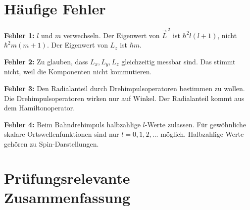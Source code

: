 \section{Häufige Fehler}

\begin{warningbox}
\textbf{Fehler 1:} \(l\) und \(m\) verwechseln. Der Eigenwert von \(\vec L^{\,2}\) ist \(\hbar^2l(l+1)\), nicht \(\hbar^2m(m+1)\). Der Eigenwert von \(L_z\) ist \(\hbar m\).
\end{warningbox}

\begin{warningbox}
\textbf{Fehler 2:} Zu glauben, dass \(L_x,L_y,L_z\) gleichzeitig messbar sind. Das stimmt nicht, weil die Komponenten nicht kommutieren.
\end{warningbox}

\begin{warningbox}
\textbf{Fehler 3:} Den Radialanteil durch Drehimpulsoperatoren bestimmen zu wollen. Die Drehimpulsoperatoren wirken nur auf Winkel. Der Radialanteil kommt aus dem Hamiltonoperator.
\end{warningbox}

\begin{warningbox}
\textbf{Fehler 4:} Beim Bahndrehimpuls halbzahlige \(l\)-Werte zulassen. Für gewöhnliche skalare Ortswellenfunktionen sind nur \(l=0,1,2,\dots\) möglich. Halbzahlige Werte gehören zu Spin-Darstellungen.
\end{warningbox}

\section{Prüfungsrelevante Zusammenfassung}

